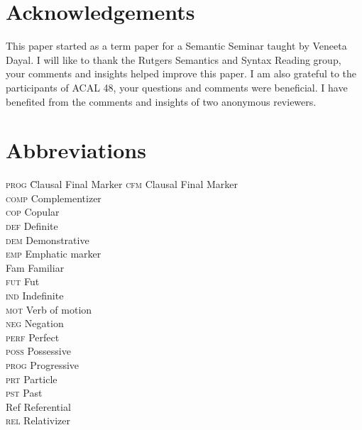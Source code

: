 \documentclass[output=paper,modfonts,nonflat,draftmode]{langsci/langscibook}
\begin{document}
\section*{Acknowledgements}
This paper started as a term paper for a Semantic Seminar taught by Veneeta Dayal. I will like to thank the Rutgers Semantics and Syntax Reading group, your comments and insights helped improve this paper. I am also grateful to the participants of  ACAL 48, your questions and comments were beneficial. I have benefited from the comments and insights of two anonymous reviewers. 


\pagebreak\section*{Abbreviations}
\begin{multicols}{2}
\begin{tabbing}
\textsc{prog}\hspace{.5em} \= Clausal Final Marker\kill
\textsc{cfm} \> Clausal Final Marker \\
\textsc{comp} \> Complementizer \\
\textsc{cop} \> Copular  \\
\textsc{def} \> Definite  \\
\textsc{dem} \> Demonstrative \\
\textsc{emp} \> Emphatic marker \\
{Fam} \> Familiar \\
\textsc{fut} \> Fut \\
\textsc{ind} \> Indefinite \\
\textsc{mot} \> Verb of motion  \\
\textsc{neg} \> Negation \\
\textsc{perf} \> Perfect \\
\textsc{poss} \> Possessive \\
\textsc{prog} \> Progressive \\
\textsc{prt} \> Particle \\
\textsc{pst} \> Past \\
{Ref} \> Referential \\
\textsc{rel} \> Relativizer 
\end{tabbing}
\end{multicols}
\end{document}
